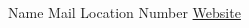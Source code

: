 \documentclass[lighthipster]{simplehipstercv}
\newlength{\rightcolwidth}
\begin{document}
\begin{paracol}{2}
        \vfill{} %

        \setlength{\parindent}{0pt}
        \begin{minipage}[t]{\rightcolwidth}
            \begin{center}\fontfamily{\sfdefault}\selectfont \color{black!70}
            {\small Name  Mail  Location  Number \newline{} \protect\url{Website}
            }
            \end{center}
        \end{minipage}

    \end{paracol}
\end{document}
